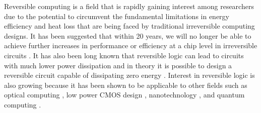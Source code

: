 Reversible computing is a field that is rapidly gaining interest among researchers due 
to the potential to circumvent the fundamental limitations in energy efficiency and heat 
loss that are being faced by traditional irreversible computing designs. It has been 
suggested that within 20 years, we will no longer be able to achieve further increases in 
performance or efficiency at a chip level in irreversible circuits \cite{Frank2005}. It has 
also been long known that reversible logic can lead to circuits with much lower power 
dissipation \cite{Landauer61} and in theory it is possible to design a reversible 
circuit capable of dissipating zero energy \cite{Bennett73}. Interest in reversible logic 
is also growing because it has been shown to be applicable to other fields such as 
optical computing \cite{Picton91}, low power CMOS design \cite{Athas94}, 
nanotechnology \cite{Merkle1993}, and quantum computing \cite{AlRabadi2004}.